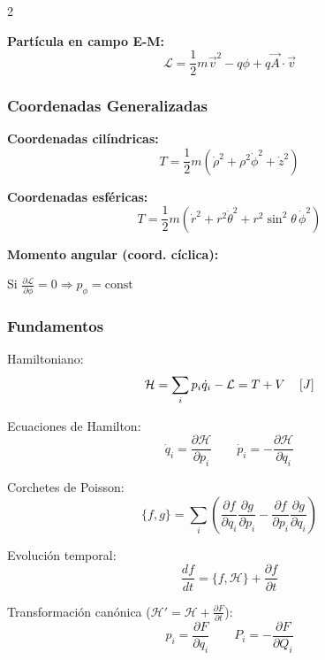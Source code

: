 \documentclass{article}
\begin{document}
\begin{multicols}{2}
\begin{itemform}
\item \textbf{Partícula en campo E-M:}
$$\mathcal{L} = \frac{1}{2}m\vec{v}^2 - q\phi + q\vec{A}\cdot\vec{v}$$
\end{itemform}

\subsubsection*{Coordenadas Generalizadas}

\begin{itemform}
\item \textbf{Coordenadas cilíndricas:}
$$T = \frac{1}{2}m(\dot{\rho}^2 + \rho^2\dot{\phi}^2 + \dot{z}^2)$$

\item \textbf{Coordenadas esféricas:}
$$T = \frac{1}{2}m(\dot{r}^2 + r^2\dot{\theta}^2 + r^2\sin^2\theta\,\dot{\phi}^2)$$

\item \textbf{Momento angular (coord. cíclica):}

Si $\frac{\partial \mathcal{L}}{\partial \phi} = 0 \Rightarrow p_\phi = \text{const}$
\end{itemform}

\columnbreak


\subsubsection*{Fundamentos}
\begin{itemform}
\item Hamiltoniano:
$$\mathcal{H} = \sum_i p_i\dot{q}_i - \mathcal{L} = T + V \quad \left[J \right]$$

\item Ecuaciones de Hamilton:
$$\dot{q}_i = \frac{\partial \mathcal{H}}{\partial p_i} \qquad \dot{p}_i = -\frac{\partial \mathcal{H}}{\partial q_i}$$

\item Corchetes de Poisson:
$$\{f,g\} = \sum_i \left(\frac{\partial f}{\partial q_i}\frac{\partial g}{\partial p_i} - \frac{\partial f}{\partial p_i}\frac{\partial g}{\partial q_i}\right)$$

\item Evolución temporal:
$$\frac{df}{dt} = \{f,\mathcal{H}\} + \frac{\partial f}{\partial t}$$

\item Transformación canónica ($\mathcal{H}'=\mathcal{H}+\frac{\partial F}{\partial t}$):
$$p_i = \frac{\partial F}{\partial q_i} \qquad P_i = -\frac{\partial F}{\partial Q_i}$$
\end{itemform}


\end{multicols}
\end{document}
